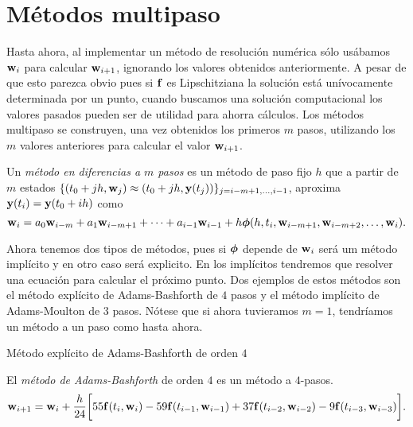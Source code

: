 \section{Métodos multipaso}

Hasta ahora, al implementar un método de resolución numérica sólo usábamos
$\vb{w}{}_i$ para calcular $\vb{w}{}_{i+1}$,
ignorando los valores obtenidos anteriormente.
A pesar de que esto parezca obvio pues si $\vb{f}{}$ es Lipschitziana
la solución está unívocamente determinada por un punto,
cuando buscamos una solución computacional
los valores pasados pueden ser de utilidad para ahorra cálculos.
Los métodos multipaso se construyen, una vez obtenidos los primeros $m$ pasos,
utilizando los $m$ valores anteriores para calcular el valor $\vb{w}{}_{i+1}$.

\begin{definition}
    Un \emph{método en diferencias a $m$ pasos} es un método de paso fijo $h$
    que a partir de $m$ estados
    $\{(t_0 + jh, \vb{w}{}_j) \approx (t_0 + jh, \vb{y}{}(t_j))\}_{j = i-m+1,\ldots,i-1}$,
    aproxima $\vb{y}{}(t_i) = \vb{y}{}(t_0 + ih)$ como
    \begin{equation*}
        \vb{w}{}_i = a_0\vb{w}{}_{i-m} + a_1\vb{w}{}_{i-m+1} + \dots + a_{i-1}\vb{w}{}_{i-1}
            + h\vb*{\phi}{}(h, t_i, \vb{w}{}_{i-m+1}, \vb{w}{}_{i-m+2}, \dots, \vb{w}{}_i).
    \end{equation*}
\end{definition}

Ahora tenemos dos tipos de métodos, pues si $\vb*{\phi}{}$ depende de $\vb{w}{}_i$
será um método implícito y en otro caso será explicito.
En los implícitos tendremos que resolver una ecuación
para calcular el próximo punto.
Dos ejemplos de estos métodos son
el método explícito de Adams-Bashforth de $4$ pasos y
el método implícito de Adams-Moulton de $3$ pasos.
Nótese que si ahora tuvieramos $m = 1$,
tendríamos un método a un paso como hasta ahora.

\begin{method}{Método explícito de Adams-Bashforth de orden $4$}
    \label{met:AB4steps}

    El \emph{método de Adams-Bashforth} de orden $4$
    es un método a $4$-pasos.
    \begin{equation}
        \vb{w}{}_{i+1} = \vb{w}{}_i + \frac{h}{24}\qty\bigg[
            55\vb{f}{}(t_i, \vb{w}{}_i) - 59\vb{f}{}(t_{i-1}, \vb{w}{}_{i-1})
            + 37\vb{f}{}(t_{i-2}, \vb{w}{}_{i-2}) - 9\vb{f}{}(t_{i-3}, \vb{w}{}_{i-3})
        ].
    \end{equation}
\end{method}

